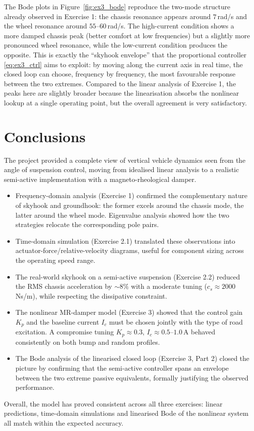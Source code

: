 The Bode plots in Figure~\ref{fig:ex3_bode} reproduce the two-mode
structure already observed in Exercise 1: the chassis resonance
appears around $7$\,rad/s and the wheel resonance around
$55$--$60$\,rad/s. The high-current condition shows a more damped
chassis peak (better comfort at low frequencies) but a slightly more
pronounced wheel resonance, while the low-current condition produces
the opposite. This is exactly the ``skyhook envelope'' that the
proportional controller \eqref{eq:ex3_ctrl} aims to exploit: by
moving along the current axis in real time, the closed loop can
choose, frequency by frequency, the most favourable response between
the two extremes. Compared to the linear analysis of Exercise 1, the
peaks here are slightly broader because the linearisation absorbs
the nonlinear lookup at a single operating point, but the overall
agreement is very satisfactory.

\section{Conclusions}
The project provided a complete view of vertical vehicle dynamics
seen from the angle of suspension control, moving from idealised
linear analysis to a realistic semi-active implementation with a
magneto-rheological damper.

\begin{itemize}
    \item Frequency-domain analysis (Exercise 1) confirmed the
          complementary nature of skyhook and groundhook: the former
          excels around the chassis mode, the latter around the wheel
          mode. Eigenvalue analysis showed how the two strategies
          relocate the corresponding pole pairs.
    \item Time-domain simulation (Exercise 2.1) translated these
          observations into actuator-force/relative-velocity
          diagrams, useful for component sizing across the operating
          speed range.
    \item The real-world skyhook on a semi-active suspension
          (Exercise 2.2) reduced the RMS chassis acceleration by
          $\sim 8\%$ with a moderate tuning ($c_s \approx 2000$\,Ns/m),
          while respecting the dissipative constraint.
    \item The nonlinear MR-damper model (Exercise 3) showed that the
          control gain $K_p$ and the baseline current $I_c$ must be
          chosen jointly with the type of road excitation. A
          compromise tuning $K_p \approx 0.3$, $I_c \approx
          0.5$--$1.0$\,A behaved consistently on both bump and random
          profiles.
    \item The Bode analysis of the linearised closed loop
          (Exercise 3, Part 2) closed the picture by confirming that
          the semi-active controller spans an envelope between the
          two extreme passive equivalents, formally justifying the
          observed performance.
\end{itemize}

Overall, the model has proved consistent across all three exercises:
linear predictions, time-domain simulations and linearised Bode of
the nonlinear system all match within the expected accuracy.
